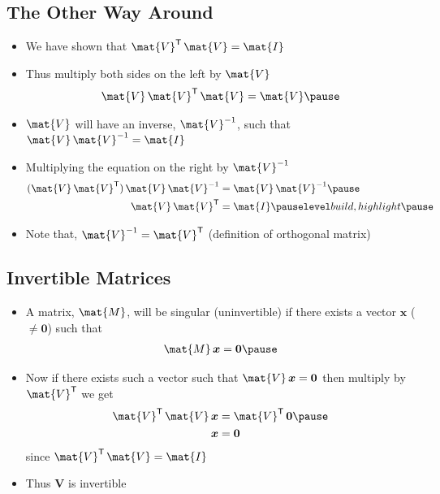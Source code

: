 \documentclass[25pt,landscape,footrule]{foils}
\begin{document}
\begin{slide}
\section[-2]{The Other Way Around}

\begin{PauseHighLight}
  \begin{itemize}
  \item We have shown that $\mat{V}^\tr \, \mat{V} = \mat{I}$\pause
  \item Thus multiply both sides on the left by $\mat{V}$
    \begin{align*}
      \mat{V}\,\mat{V}^\tr \, \mat{V} = \mat{V}\pause
    \end{align*}
  \item $\mat{V}$ will have an inverse,
    $\mat{V}^{-1}$, such that
    $\mat{V} \, \mat{V}^{-1} = \mat{I}$\pause
  \item Multiplying the equation on the right by $\mat{V}^{-1}$
    \begin{align*}
      (\mat{V}\,\mat{V}^\tr) \, \mat{V} \, \mat{V}^{-1}
      &= \mat{V}\,\mat{V}^{-1}\pause  \\
      \mat{V}\,\mat{V}^\tr &= \mat{I}\pauseb
    \end{align*}
  \item Note that, $\mat{V}^{-1}=\mat{V}^\tr$ (definition of
    orthogonal matrix)\pause
  \end{itemize}
\end{PauseHighLight}

\end{slide}


\begin{slide}
\section[-2]{Invertible Matrices}

\begin{PauseHighLight}
  \begin{itemize}
  \item A matrix, $\mat{M}$, will be singular (uninvertible) if there
    exists a vector $\bm{x}$ ($\neq\bm{0}$) such that
    \begin{align*}
      \mat{M}\,\bm{x} = \bm{0}\pause
    \end{align*}
  \item Now if there exists such a vector such that $\mat{V}\,\bm{x} =
    \bm{0}$ then multiply by $\mat{V}^\tr$ we get
    \begin{align*}
      \mat{V}^\tr\, \mat{V}\, \bm{x} &= \mat{V}^\tr\, \bm{0} \pause \\
      \bm{x} &= \bm{0}
    \end{align*}
    since $\mat{V}^\tr\, \mat{V} = \mat{I}$\pauseb
  \item Thus $\bm{V}$ is invertible\pauseb
  \end{itemize}
\end{PauseHighLight}

\end{slide}
\end{document}
